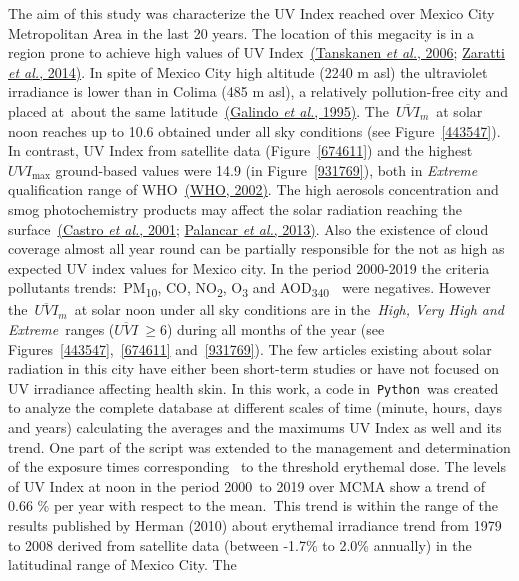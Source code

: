 \documentclass[10pt]{article}
\begin{document}
{\label{507127}}

The aim of this study was characterize the UV Index reached over Mexico
City Metropolitan Area in the last 20 years. The location of this
megacity is in a region prone to achieve high values of UV
Index~\hyperref[csl:27]{(Tanskanen \textit{et al.}, 2006}; \hyperref[csl:26]{Zaratti \textit{et al.}, 2014)}. In spite of Mexico City high altitude (2240 m
asl) the ultraviolet irradiance is lower than in Colima (485 m asl), a
relatively pollution-free city and placed at~about the same
latitude~\hyperref[csl:19]{(Galindo \textit{et al.}, 1995)}. The~\(\overline{UVI}_m\)~at solar noon
reaches up to 10.6 obtained under all sky conditions (see
Figure~{\ref{443547}}). In contrast, UV Index from
satellite data (Figure~{\ref{674611}}) and the
highest~\(UVI_{\max}\) ground-based values were 14.9 (in
Figure~{\ref{931769}}), both in \emph{Extreme}
qualification range of WHO~\hyperref[csl:24]{(WHO, 2002)}. The high aerosols
concentration and smog photochemistry products may affect the solar
radiation reaching the surface~\hyperref[csl:14]{(Castro \textit{et al.}, 2001}; \hyperref[csl:13]{Palancar \textit{et al.}, 2013)}. Also the existence of
cloud coverage almost all year round can be partially responsible for
the not as high as expected UV index values for Mexico city. In the
period 2000-2019 the criteria pollutants trends:~PM\textsubscript{10},
CO, NO\textsubscript{2}, O\textsubscript{3} and
AOD\textsubscript{340~}~were negatives. However
the~\(\overline{UVI}_m\)~at solar noon under all sky conditions are in
the\emph{~High, Very High and Extreme}~ranges (\(\overline{UVI}\ \ge6\))
during all months of the year (see
Figures~{\ref{443547}},~{\ref{674611}}
and~{\ref{931769}}). The few articles existing about
solar radiation in this city have either been short-term studies or have
not focused on UV irradiance affecting health skin. In this work, a code
in~\texttt{Python}~was created to analyze the complete database at
different scales of time (minute, hours, days and years) calculating the
averages and the maximums UV Index as well and its trend. One part of
the script was extended to the management and determination of the
exposure times corresponding~ to the threshold erythemal dose. The
levels of UV Index at noon in the period 2000~to 2019 over MCMA show a
trend of 0.66 \% per year with respect to the mean.~This trend is within
the range of the results published by Herman (2010) about erythemal
irradiance trend from 1979 to 2008 derived from satellite data (between
-1.7\% to 2.0\% annually) in the latitudinal range of Mexico City. The
\end{document}
